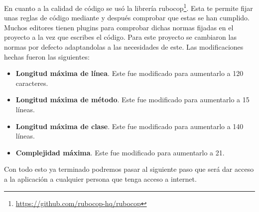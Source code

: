 En cuanto a la calidad de código se usó la librería rubocop\footnote{\url{https://github.com/rubocop-hq/rubocop}}. Esta te permite
fijar unas reglas de código mediante y después comprobar que estas se han cumplido.
Muchos editores tienen plugins para comprobar dichas normas fijadas en el proyecto
a la vez que escribes el código. Para este proyecto se cambiaron las normas por defecto
adaptandolas a las necesidades de este. Las modificaciones hechas fueron las siguientes:

\begin{itemize}
  \item \textbf{Longitud máxima de línea}. Este fue modificado para aumentarlo a 120 caracteres.
  \item \textbf{Longitud máxima de método}. Este fue modificado para aumentarlo a 15 líneas.
  \item \textbf{Longitud máxima de clase}. Este fue modificado para aumentarlo a 140 líneas.
  \item \textbf{Complejidad máxima}. Este fue modificado para aumentarlo a 21.
\end{itemize}

Con todo esto ya terminado podremos pasar al siguiente paso que será
dar acceso a la aplicación a cualquier persona que tenga acceso a internet.
